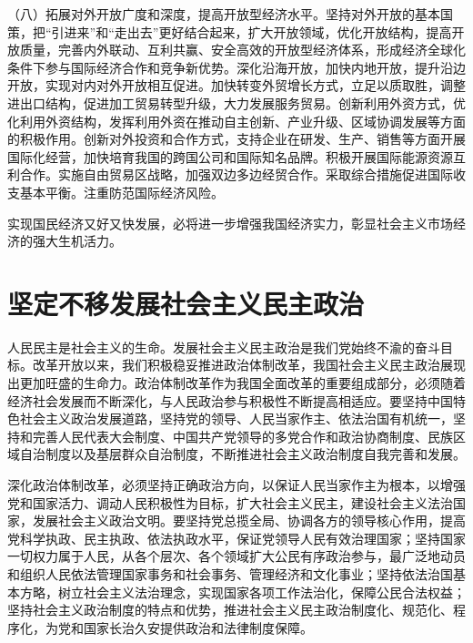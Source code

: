（八）拓展对外开放广度和深度，提高开放型经济水平。坚持对外开放的基本国策，把“引进来”和“走出去”更好结合起来，扩大开放领域，优化开放结构，提高开放质量，完善内外联动、互利共赢、安全高效的开放型经济体系，形成经济全球化条件下参与国际经济合作和竞争新优势。深化沿海开放，加快内地开放，提升沿边开放，实现对内对外开放相互促进。加快转变外贸增长方式，立足以质取胜，调整进出口结构，促进加工贸易转型升级，大力发展服务贸易。创新利用外资方式，优化利用外资结构，发挥利用外资在推动自主创新、产业升级、区域协调发展等方面的积极作用。创新对外投资和合作方式，支持企业在研发、生产、销售等方面开展国际化经营，加快培育我国的跨国公司和国际知名品牌。积极开展国际能源资源互利合作。实施自由贸易区战略，加强双边多边经贸合作。采取综合措施促进国际收支基本平衡。注重防范国际经济风险。

实现国民经济又好又快发展，必将进一步增强我国经济实力，彰显社会主义市场经济的强大生机活力。

\section{坚定不移发展社会主义民主政治}

人民民主是社会主义的生命。发展社会主义民主政治是我们党始终不渝的奋斗目标。改革开放以来，我们积极稳妥推进政治体制改革，我国社会主义民主政治展现出更加旺盛的生命力。政治体制改革作为我国全面改革的重要组成部分，必须随着经济社会发展而不断深化，与人民政治参与积极性不断提高相适应。要坚持中国特色社会主义政治发展道路，坚持党的领导、人民当家作主、依法治国有机统一，坚持和完善人民代表大会制度、中国共产党领导的多党合作和政治协商制度、民族区域自治制度以及基层群众自治制度，不断推进社会主义政治制度自我完善和发展。

深化政治体制改革，必须坚持正确政治方向，以保证人民当家作主为根本，以增强党和国家活力、调动人民积极性为目标，扩大社会主义民主，建设社会主义法治国家，发展社会主义政治文明。要坚持党总揽全局、协调各方的领导核心作用，提高党科学执政、民主执政、依法执政水平，保证党领导人民有效治理国家；坚持国家一切权力属于人民，从各个层次、各个领域扩大公民有序政治参与，最广泛地动员和组织人民依法管理国家事务和社会事务、管理经济和文化事业；坚持依法治国基本方略，树立社会主义法治理念，实现国家各项工作法治化，保障公民合法权益；坚持社会主义政治制度的特点和优势，推进社会主义民主政治制度化、规范化、程序化，为党和国家长治久安提供政治和法律制度保障。

